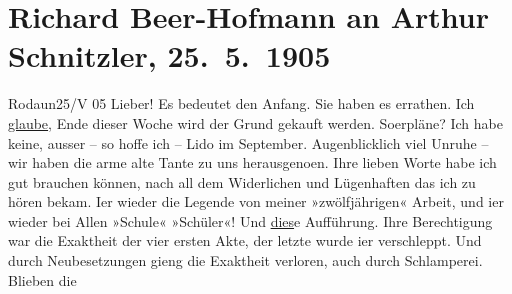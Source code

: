

               \section[Richard Beer-Hofmann an Arthur Schnitzler, 25. 5. 1905]{ Richard Beer-Hofmann an Arthur Schnitzler,
               25. 5. 1905}\nopagebreak{}\rehead{ }\begin{ledgroupsized}[t]{13cm}\normalsize\beginnumbering{} \toendnotes[C]{\smallbreak\pagebreak[2]} 
\toendnotes[C]{\smallbreak}\pstart
           \raggedleft{}{\pb}Rodaun25/V 05\pend
           \pstart
           Lieber! Es bedeutet den Anfang. Sie haben es errathen. Ich \uline{glaube}, Ende dieser Woche wird der Grund gekauft
               werden. So{\geminationm}erpläne? Ich habe keine, ausser – so hoffe
               ich – Lido im September. Augenblicklich
               viel Unruhe – wir haben die arme alte Tante zu uns herausgeno{\geminationm}en.\pend
           \pstart
           Ihre lieben Worte habe ich gut brauchen können, nach all dem Widerlichen und
               Lügenhaften das ich zu hören bekam. I{\geminationm}er wieder die
               Legende von meiner »zwölf{\pb}jährigen«
               Arbeit, und i{\geminationm}er wieder bei Allen »Schule« »Schüler«!
               Und \uline{dies}e Aufführung. Ihre Berechtigung war die Exaktheit der vier
               ersten Akte, der letzte wurde i{\geminationm}er verschleppt. Und
               durch Neubesetzungen gieng die Exaktheit verloren, auch durch Schlamperei. Blieben die

\end{ledgroupsized}
